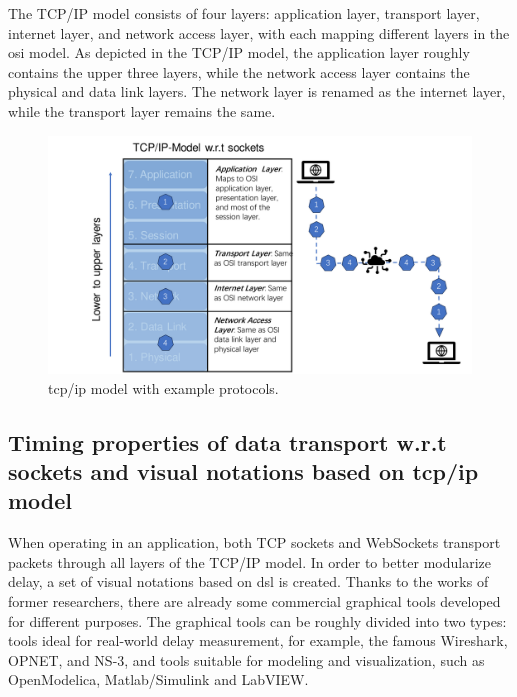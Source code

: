 The TCP/IP model consists of four layers: application layer, transport layer, 
internet layer, and network access layer, with each mapping different layers in 
the \gls{osi} model. As depicted in the TCP/IP model, the application layer roughly 
contains the upper three layers, while the network access layer contains the 
physical and data link layers. The network layer is renamed as the internet 
layer, while the transport layer remains the same.

\begin{figure}[htb]
    \centering
    \includegraphics[width=\textwidth]{figures/TCP_IP.pdf}
    \caption{\gls{tcp/ip} model with example protocols. \label{fig: TCP_IP}}
\end{figure}

\subsection{Timing properties of data transport w.r.t sockets and visual notations based on \gls{tcp/ip} model}
When operating in an application, both TCP sockets and WebSockets transport packets 
through all layers of the TCP/IP model. In order to better modularize delay, a set of 
visual notations based on \gls{dsl} is created.
Thanks to the works of former researchers, there are already some commercial graphical tools 
developed for different purposes. The graphical tools 
can be roughly divided into two types: tools ideal for real-world delay measurement, 
for example, the famous Wireshark, OPNET, and NS-3, 
and tools suitable for modeling and visualization, such as OpenModelica, 
Matlab/Simulink and LabVIEW.


